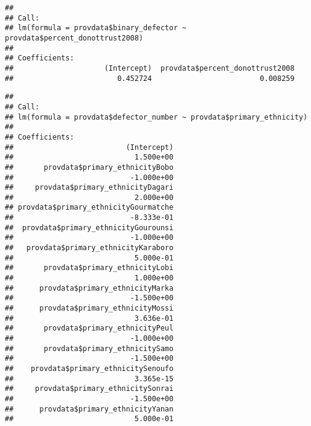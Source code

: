 \documentclass[]{article}
\newenvironment{Shaded}{\begin{snugshade}}{\end{snugshade}}
\newcommand{\CommentTok}[1]{\textcolor[rgb]{0.56,0.35,0.01}{\textit{#1}}}
\newcommand{\KeywordTok}[1]{\textcolor[rgb]{0.13,0.29,0.53}{\textbf{#1}}}
\newcommand{\NormalTok}[1]{#1}
\newcommand{\OperatorTok}[1]{\textcolor[rgb]{0.81,0.36,0.00}{\textbf{#1}}}
\newcommand{\StringTok}[1]{\textcolor[rgb]{0.31,0.60,0.02}{#1}}
\begin{document}
\begin{Shaded}
\end{Shaded}

\begin{verbatim}
## 
## Call:
## lm(formula = provdata$binary_defector ~ provdata$percent_donottrust2008)
## 
## Coefficients:
##                     (Intercept)  provdata$percent_donottrust2008  
##                        0.452724                         0.008259
\end{verbatim}

\begin{Shaded}
\end{Shaded}

\begin{verbatim}
## 
## Call:
## lm(formula = provdata$defector_number ~ provdata$primary_ethnicity)
## 
## Coefficients:
##                          (Intercept)  
##                            1.500e+00  
##       provdata$primary_ethnicityBobo  
##                           -1.000e+00  
##     provdata$primary_ethnicityDagari  
##                            2.000e+00  
## provdata$primary_ethnicityGourmatche  
##                           -8.333e-01  
##  provdata$primary_ethnicityGourounsi  
##                           -1.000e+00  
##   provdata$primary_ethnicityKaraboro  
##                            5.000e-01  
##       provdata$primary_ethnicityLobi  
##                            1.000e+00  
##      provdata$primary_ethnicityMarka  
##                           -1.500e+00  
##      provdata$primary_ethnicityMossi  
##                            3.636e-01  
##       provdata$primary_ethnicityPeul  
##                           -1.000e+00  
##       provdata$primary_ethnicitySamo  
##                           -1.500e+00  
##    provdata$primary_ethnicitySenoufo  
##                            3.365e-15  
##     provdata$primary_ethnicitySonrai  
##                           -1.500e+00  
##      provdata$primary_ethnicityYanan  
##                            5.000e-01
\end{verbatim}
\end{document}
